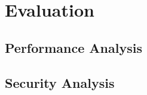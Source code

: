 \section{Evaluation}
\label{sec:eval}

\subsection{Performance Analysis}

\subsection{Security Analysis}
